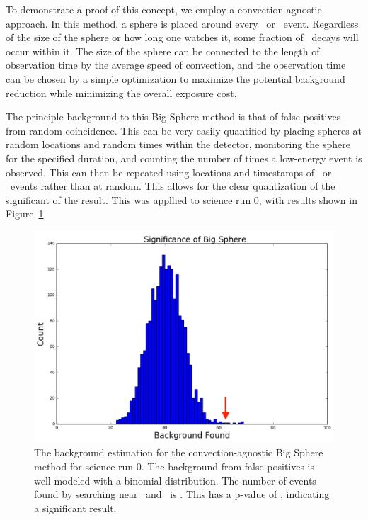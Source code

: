 To demonstrate a proof of this concept, we employ a convection-agnostic approach. In this method, a sphere is placed around every \Po~or \BiPo~event. Regardless of the size of the sphere or how long one watches it, some fraction of \Pb~decays will occur within it. The size of the sphere can be connected to the length of observation time by the average speed of convection, and the observation time can be chosen by a simple optimization to maximize the potential background reduction while minimizing the overall exposure cost.

The principle background to this Big Sphere method is that of false positives from random coincidence. This can be very easily quantified by placing spheres at random locations and random times within the detector, monitoring the sphere for the specified duration, and counting the number of times a low-energy event is observed. This can then be repeated using locations and timestamps of \Po~or \BiPo~events rather than at random. This allows for the clear quantization of the significant of the result. This was appllied to science run 0, with results shown in Figure~\ref{fig:bs_sr0}.

\begin{figure}[htb]
    \includegraphics[width=\textwidth]{figures/rnveto/BigSphere}
    \caption{ The background estimation for the convection-agnostic Big Sphere method for science run 0. The background from false positives is well-modeled with a binomial distribution. The number of events found by searching near \Po~and \BiPo~is . This has a p-value of , indicating a significant result.}\label{fig:bs_sr0}
\end{figure}

